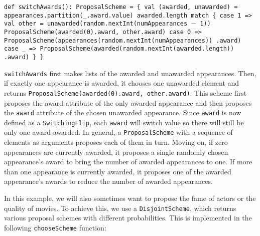 \begin{flushleft}
\texttt{def switchAwards(): ProposalScheme = \{
\newline \tab val (awarded, unawarded) = 
\newline \tab appearances.partition(\_.award.value)
\newline \tab awarded.length match \{
\newline \tab case 1 =>
\newline \tab val other = unawarded(random.nextInt(numAppearances $-$ 1)) 
\newline \tab ProposalScheme(awarded(0).award, other.award)
\newline \tab case 0 => 
\newline \tab ProposalScheme(appearances(random.nextInt(numAppearances))
\newline \tab .award)
\newline \tab case \_ => 
\newline \tab ProposalScheme(awarded(random.nextInt(awarded.length))
\newline \tab .award)
\newline \}
\newline \}
}
\end{flushleft}

\texttt{switchAwards} first makes lists of the awarded and unawarded appearances. Then, if exactly one appearance is awarded, it chooses one unawarded element and returns \texttt{ProposalScheme(awarded(0).award, other.award)}. This scheme first proposes the award attribute of the only awarded appearance and then proposes the \texttt{award} attribute of the chosen unawarded appearance. Since \texttt{award} is now defined as a \texttt{SwitchingFlip}, each \texttt{award} will switch value so there will still be only one award awarded. In general, a \texttt{ProposalScheme} with a sequence of elements as arguments proposes each of them in turn. Moving on, if zero appearances are currently awarded, it proposes a single randomly chosen appearance's award to bring the number of awarded appearances to one. If more than one appearance is currently awarded, it proposes one of the awarded appearance's awards to reduce the number of awarded appearances.

In this example, we will also sometimes want to propose the fame of actors or the quality of movies. To achieve this, we use a \texttt{Disjoint\-Scheme}, which returns various proposal schemes with different probabilities. This is implemented in the following \texttt{chooseScheme} function:

